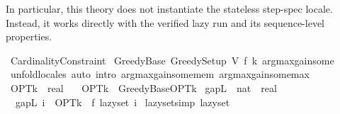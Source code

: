 \begin{isabellebody}
\begin{isamarkuptext}
  In particular, this theory does not instantiate the stateless step-spec
  locale. Instead, it works directly with the verified lazy run and its
  sequence-level properties.%
\end{isamarkuptext}\isamarkuptrue%
\isamarkupfalse%
\ Cardinality{\isacharunderscore}{\kern0pt}Constraint\isanewline
{}\isanewline
\isanewline
{}\isamarkupfalse%
\ Greedy{\isacharunderscore}{\kern0pt}Base{\isacharcolon}{\kern0pt}\ Greedy{\isacharunderscore}{\kern0pt}Setup\ V\ f\ k\ argmax{\isacharunderscore}{\kern0pt}gain{\isacharunderscore}{\kern0pt}some\isanewline
%
\isadelimproof
\ \ %
\endisadelimproof
%
\isatagproof
{}\isamarkupfalse%
\ {\isacharparenleft}{\kern0pt}unfold{\isacharunderscore}{\kern0pt}locales{\isacharparenright}{\kern0pt}\ {\isacharparenleft}{\kern0pt}auto\ intro{\isacharcolon}{\kern0pt}\ argmax{\isacharunderscore}{\kern0pt}gain{\isacharunderscore}{\kern0pt}some{\isacharunderscore}{\kern0pt}mem\ argmax{\isacharunderscore}{\kern0pt}gain{\isacharunderscore}{\kern0pt}some{\isacharunderscore}{\kern0pt}max{\isacharparenright}{\kern0pt}%
\endisatagproof
{\isafoldproof}%
%
\isadelimproof
\isanewline
%
\endisadelimproof
\isanewline
{}\isamarkupfalse%
\ OPT{\isacharunderscore}{\kern0pt}k\ {\isacharcolon}{\kern0pt}{\isacharcolon}{\kern0pt}\ real\ \isanewline
\ \ {\isachardoublequoteopen}OPT{\isacharunderscore}{\kern0pt}k\ {\isasymequiv}\ Greedy{\isacharunderscore}{\kern0pt}Base{\isachardot}{\kern0pt}OPT{\isacharunderscore}{\kern0pt}k{\isachardoublequoteclose}\isanewline
\isanewline
{}\isamarkupfalse%
\ gapL\ {\isacharcolon}{\kern0pt}{\isacharcolon}{\kern0pt}\ {\isachardoublequoteopen}nat\ {\isasymRightarrow}\ real{\isachardoublequoteclose}\ \isanewline
\ \ {\isachardoublequoteopen}gapL\ i\ {\isacharequal}{\kern0pt}\ OPT{\isacharunderscore}{\kern0pt}k\ {\isacharminus}{\kern0pt}\ f\ {\isacharparenleft}{\kern0pt}lazy{\isacharunderscore}{\kern0pt}set\ i{\isacharparenright}{\kern0pt}{\isachardoublequoteclose}\isanewline
\isanewline
{}\isamarkupfalse%
\ lazy{\isacharunderscore}{\kern0pt}set{\isacharunderscore}{\kern0pt}{}{\isacharbrackleft}{\kern0pt}simp{\isacharbrackright}{\kern0pt}{\isacharcolon}{\kern0pt}\ {\isachardoublequoteopen}lazy{\isacharunderscore}{\kern0pt}set\ {}\ {\isacharequal}{\kern0pt}\ {\isacharbraceleft}{\kern0pt}{\isacharbraceright}{\kern0pt}{\isachardoublequoteclose}\isanewline
%
\isadelimproof
\ \ %

\end{isabellebody}
